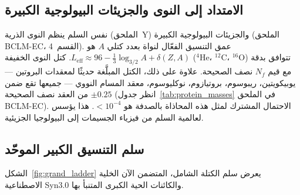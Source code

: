 \documentclass[11pt,a4paper]{article}
\begin{document}
	\subsection{الامتداد إلى النوى والجزيئات البيولوجية الكبيرة}
	
	نفس السلم ينظم النوى الذرية (الملحق~Y) والجزيئات البيولوجية الكبيرة (الملحق BCLM-EC، القسم~4). عمق التنسيق الفعّال لنواة بعدد كتلي \(A\) هو \(L_{\mathrm{eff}} \approx 96 - \frac13 \log_{3/2} A + \delta(Z,A)\). كتل النوى الخفيفة (\(^4\)He، \(^{12}\)C، \(^{16}\)O) تتوافق بدقة مع قيم \(N_f\) نصف الصحيحة. علاوة على ذلك، الكتل المبلَّغة حديثًا لمعقدات البروتين — يوبيكويتين، ريبوسوم، بروتيازوم، نوكليوسوم، معقد المسام النووي — جميعها تقع ضمن \(\pm 0.25\) من العقد نصف الصحيحة (انظر جدول~\ref{tab:protein_masses} في الملحق BCLM-EC). الاحتمال المشترك لمثل هذه المحاذاة بالصدفة هو \(< 10^{-4}\). هذا يؤسس لعالمية السلم من فيزياء الجسيمات إلى البيولوجيا الجزيئية.
	
	\subsection{سلم التنسيق الكبير الموحّد}
	
	الشكل~\ref{fig:grand_ladder} يعرض سلم الكتلة الشامل، المتضمن الآن الخلية الاصطناعية Syn3.0 والكائنات الحية الكبرى المتنبأ بها.
	
\end{document}
